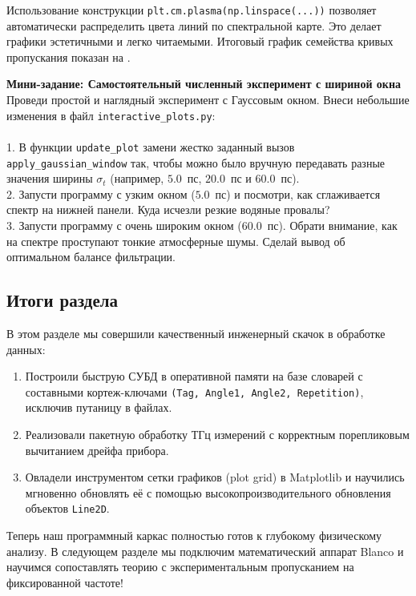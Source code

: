 Использование конструкции \texttt{plt.cm.plasma(np.linspace(...))} позволяет автоматически распределить цвета линий по спектральной карте. Это делает графики эстетичными и легко читаемыми. Итоговый график семейства кривых пропускания показан на .


\begin{minitaskbox}
	\textbf{Мини-задание: Самостоятельный численный эксперимент с шириной окна} \\
	Проведи простой и наглядный эксперимент с Гауссовым окном. Внеси небольшие изменения в файл \texttt{interactive\_plots.py}: \\ \\
	1. В функции \texttt{update\_plot} замени жестко заданный вызов \texttt{apply\_gaussian\_window} так, чтобы можно было вручную передавать разные значения ширины $\sigma_t$ (например, $5.0$~пс, $20.0$~пс и $60.0$~пс). \\
	2. Запусти программу с узким окном ($5.0$~пс) и посмотри, как сглаживается спектр на нижней панели. Куда исчезли резкие водяные провалы? \\
	3. Запусти программу с очень широким окном ($60.0$~пс). Обрати внимание, как на спектре проступают тонкие атмосферные шумы. Сделай вывод об оптимальном балансе фильтрации.
\end{minitaskbox}

\subsection{Итоги раздела}

В этом разделе мы совершили качественный инженерный скачок в обработке данных:
\begin{enumerate}
    \item Построили быструю СУБД в оперативной памяти на базе словарей с составными кортеж-ключами \texttt{(Tag, Angle1, Angle2, Repetition)}, исключив путаницу в файлах.
    \item Реализовали пакетную обработку ТГц измерений с корректным порепликовым вычитанием дрейфа прибора.
    \item Овладели инструментом сетки графиков (plot grid) в Matplotlib и научились мгновенно обновлять её с помощью высокопроизводительного обновления объектов \texttt{Line2D}.
\end{enumerate}


Теперь наш программный каркас полностью готов к глубокому физическому анализу. В следующем разделе мы подключим математический аппарат Blanco и научимся сопоставлять теорию с экспериментальным пропусканием на фиксированной частоте!
